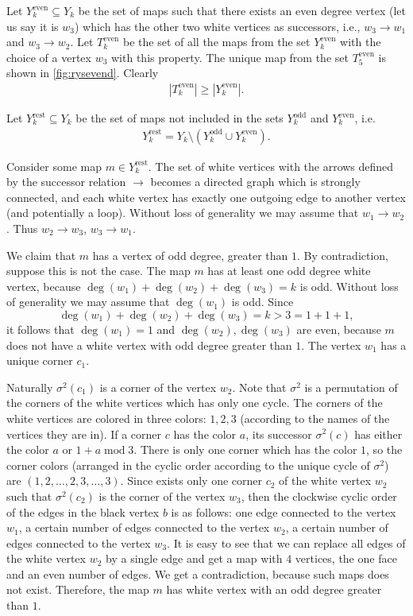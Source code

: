 \documentclass[submission]{FPSAC2021}
\DeclareMathOperator{\degg}{deg}
\DeclareMathOperator{\odd}{odd}
\DeclareMathOperator{\even}{even}
\DeclareMathOperator{\rest}{rest}
\newcommand{\nast}
{
	\sigma
}
\begin{document}
Let $Y_{k}^{\even}\subseteq Y_k$ be the set of maps such that there
exists an even degree vertex (let us say it is $w_3$) which has the other 
two white vertices as successors, i.e., $w_3\rightarrow w_1$ and $w_3\rightarrow w_2$. 
Let $T_k^{\even}$ be the set of all the maps from the set $Y_k^{\even}$ with the choice 
of a vertex $w_3$ with this property.  
The unique map from the set $T_{5}^{\even}$ is shown in \cref{fig:rysevend}.
Clearly
\begin{align}
\label{ineqeven}
|T_{k}^{\even}| \geq |Y_{k}^{\even}|.
\end{align}

Let $Y_{k}^{\rest}\subseteq Y_k$ be the set of maps not included in the
sets $Y_{k}^{\odd}$ and $Y_{k}^{\even}$, i.e. 
\begin{align}
\label{yrestdef}
Y_{k}^{\rest}=Y_k \setminus (Y_{k}^{\odd} \cup Y_{k}^{\even}).
\end{align}

Consider some map $m\in Y_{k}^{\rest}$. 
The set of white vertices with the arrows defined by the successor relation
$\rightarrow$ becomes a directed graph which is strongly connected, and each
white vertex has exactly one outgoing edge to another vertex (and potentially a
loop). Without  loss  of  generality  we  may  assume  that $w_1 \rightarrow w_2$. Thus $w_2 \rightarrow w_3$, $w_3 \rightarrow w_1$.

We claim that $m$ has a vertex of odd degree, greater than $1$. By contradiction,  suppose this is not the case. The map $m$ has at least one odd degree white vertex,
because $\degg(w_1)+\degg(w_2)+\degg(w_3)=k$ is odd. Without loss of generality we may assume that $\degg(w_1)$ is odd. Since $$\degg(w_1)+\degg(w_2)+\degg(w_3)=k>3=1+1+1,$$ %
it follows that $\degg(w_1)=1$ and $\degg(w_2),\degg(w_3)$ are even, because $m$
does not have a white vertex with odd degree greater than $1$. The vertex $w_1$
has a unique corner $c_1$.

Naturally $\nast^2(c_1)$ 
is a corner of the vertex $w_2$. 
Note that $\nast^2$ is a permutation of the corners of 
the white vertices which has only one cycle. 
The corners of the white vertices are colored in three colors: $1, 2, 3$
(according to the names of the vertices they are in).  
If a corner $c$ has the color $a$, 
its successor $\nast^2(c)$ has either the color $a$ or $1+a \operatorname{mod} 3$. 
There is only one corner which has the color $1$, so the corner colors 
(arranged in the cyclic order according to the unique cycle of $\nast^2$) are 
$(1, 2, \ldots, 2, 3, \ldots, 3)$.
Since exists only one corner $ c_2 $ of the white vertex $ w_2 $ such 
that $ \nast ^ 2 (c_2) $ is the corner of the vertex $ w_3 $, 
then the clockwise cyclic order of the edges in the black vertex $b$ is as
follows: one edge connected to the vertex $w_1$, a certain number of edges connected
to the vertex $w_2$, a certain number of edges connected to the vertex $w_3$.
It is easy to see that we can replace all edges of the white vertex $w_2$ by a
single edge and get a map with $4$ vertices, the one face and an even number of
edges. We get a contradiction, because such maps does not exist. Therefore, the
map $m$ has white vertex with an odd degree greater than $1$.
\end{document}
